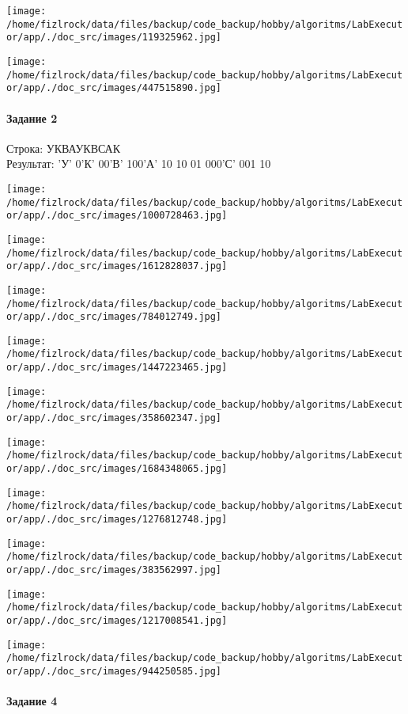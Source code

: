 \documentclass[a4paper, 12pt]{article}
\begin{document}
\texttt{[image: /home/fizlrock/data/files/backup/code\_backup/hobby/algoritms/LabExecutor/app/./doc\_src/images/119325962.jpg]}

\texttt{[image: /home/fizlrock/data/files/backup/code\_backup/hobby/algoritms/LabExecutor/app/./doc\_src/images/447515890.jpg]}
\pagebreak
\paragraph{Задание 2}

Строка: 
УКВАУКВСАК\\
Результат: 'У' 0'К' 00'В' 100'А' 10 10 01 000'С' 001 10

\texttt{[image: /home/fizlrock/data/files/backup/code\_backup/hobby/algoritms/LabExecutor/app/./doc\_src/images/1000728463.jpg]}

\texttt{[image: /home/fizlrock/data/files/backup/code\_backup/hobby/algoritms/LabExecutor/app/./doc\_src/images/1612828037.jpg]}

\texttt{[image: /home/fizlrock/data/files/backup/code\_backup/hobby/algoritms/LabExecutor/app/./doc\_src/images/784012749.jpg]}

\texttt{[image: /home/fizlrock/data/files/backup/code\_backup/hobby/algoritms/LabExecutor/app/./doc\_src/images/1447223465.jpg]}

\texttt{[image: /home/fizlrock/data/files/backup/code\_backup/hobby/algoritms/LabExecutor/app/./doc\_src/images/358602347.jpg]}

\texttt{[image: /home/fizlrock/data/files/backup/code\_backup/hobby/algoritms/LabExecutor/app/./doc\_src/images/1684348065.jpg]}

\texttt{[image: /home/fizlrock/data/files/backup/code\_backup/hobby/algoritms/LabExecutor/app/./doc\_src/images/1276812748.jpg]}

\texttt{[image: /home/fizlrock/data/files/backup/code\_backup/hobby/algoritms/LabExecutor/app/./doc\_src/images/383562997.jpg]}

\texttt{[image: /home/fizlrock/data/files/backup/code\_backup/hobby/algoritms/LabExecutor/app/./doc\_src/images/1217008541.jpg]}

\texttt{[image: /home/fizlrock/data/files/backup/code\_backup/hobby/algoritms/LabExecutor/app/./doc\_src/images/944250585.jpg]}
\pagebreak
\paragraph{Задание 4}
\end{document}
